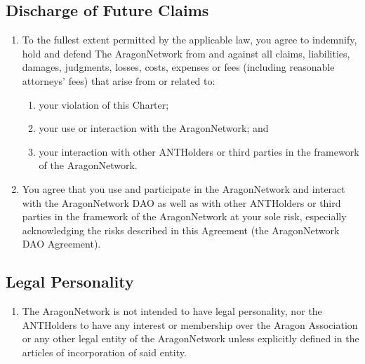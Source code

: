 \begin{enumerate}
\end{enumerate}

\subsection{Discharge of Future Claims}
\begin{enumerate}
	\item To the fullest extent permitted by the applicable law, you agree to indemnify, hold and defend The \gls{AragonNetwork} from and against all claims, liabilities, damages, judgments, losses, costs, expenses or fees (including reasonable attorneys' fees) that arise from or related to:
	\begin{enumerate}
		\item your violation of this Charter;
		\item your use or interaction with the \gls{AragonNetwork}; and
		\item your interaction with other \glspl{ANTHolder} or third parties in the
		framework of the \gls{AragonNetwork}.
	\end{enumerate}
	
	\item You agree that you use and participate in the \gls{AragonNetwork} and interact with the \gls{AragonNetwork} \ac{DAO} as well as with other \glspl{ANTHolder} or third parties in the framework of the \gls{AragonNetwork} at your sole risk, especially acknowledging the risks described in this Agreement (the \gls{AragonNetwork} \ac{DAO} Agreement).
	
\end{enumerate}

\subsection{Legal Personality}
\begin{enumerate}
	\item The \gls{AragonNetwork} is not intended to have legal personality, nor the \glspl{ANTHolder} to have any interest or membership over the Aragon Association or any other legal entity of the \gls{AragonNetwork} unless explicitly defined in the articles of incorporation of said entity.
\end{enumerate}

